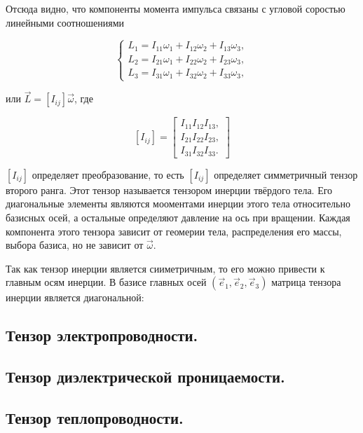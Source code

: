 	Отсюда видно, что компоненты момента импульса связаны с угловой соростью линейными соотношениями

	\[
	\left\{
	\begin{array}{l}
		L_1 = I_{11}\omega_1+I_{12}\omega_2+I_{13}\omega_3, \\
		L_2 = I_{21}\omega_1+I_{22}\omega_2+I_{23}\omega_3, \\
		L_3 = I_{31}\omega_1+I_{32}\omega_2+I_{33}\omega_3,
	\end{array} \right.
	\]

	или \( \vec{L} = [I_{ij}] \vec{\omega} \), где 

	\[ [I_{ij}] = 
		\begin{bmatrix}
			I_{11} I_{12} I_{13}, \\
			I_{21} I_{22} I_{23}, \\
			I_{31} I_{32} I_{33}.
		\end{bmatrix}
	 \]

	 \( [ I_{ij} ] \) определяет преобразование, то есть \( [ I_{ij} ] \) определяет симметричный тензор второго ранга. Этот тензор называется тензором инерции твёрдого тела. Его диагональные элементы являются мооментами инерции этого тела относительно базисных осей, а остальные определяют давление на ось при вращении. Каждая компонента этого тензора зависит от геомерии тела, распределения его массы, выбора базиса, но не зависит от \( \vec{\omega} \).

	 Так как тензор инерции является сииметричным, то его можно привести к главным осям инерции. В базисе главных осей \( ( \vec{e}_1, \vec{e}_2, \vec{e}_3 ) \) матрица тензора инерции является диагональной:
\subsection{Тензор электропроводности.}

\subsection{Тензор диэлектрической проницаемости.}

\subsection{Тензор теплопроводности.}

	
